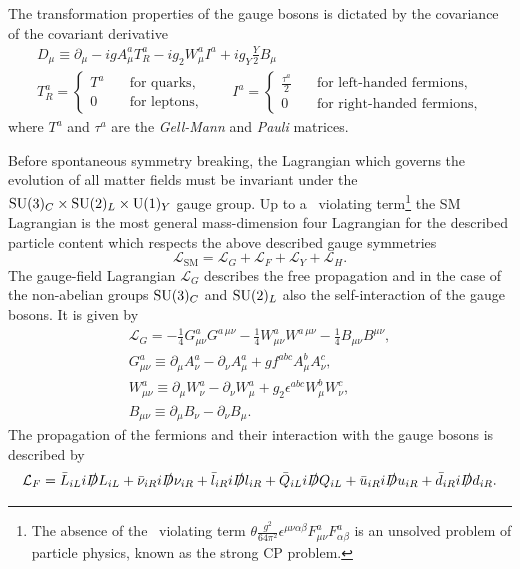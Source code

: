 The transformation properties of the gauge bosons is dictated by the covariance of the covariant derivative
\begin{equation}
\begin{gathered}
D_\mu \equiv \partial_\mu - i g A^a_\mu T_R^a - i g_2 W_\mu^a I^a + i g_Y \frac{Y}{2} B_\mu \\
T_R^a = \begin{cases} T^a \quad &\text{for quarks}, \\
  0 \quad &\text{for leptons},
\end{cases}
\qquad I^a = \begin{cases} \frac{\tau^a}{2} \quad &\text{for left-handed fermions}, \\
  0 \quad &\text{for right-handed fermions},
\end{cases}
\end{gathered}
\label{eq:2:covariant_derivative}
\end{equation}
where $T^a$ and $\tau^a$ are the \textit{Gell-Mann} and \textit{Pauli} matrices.

Before spontaneous symmetry breaking, the Lagrangian which governs the evolution of all matter fields must be invariant under the $\mathrm{SU}(3)_C \times \mathrm{SU}(2)_L \times \mathrm{U}(1)_Y$ gauge group. Up to a \Charge\Parity\ violating term\footnote{The absence of the \Charge\Parity\ violating term $\theta \frac{g^2}{64 \pi^2}\epsilon^{\mu \nu \alpha \beta} F^{a}_{\mu \nu} F^{a}_{\alpha \beta}$ is an unsolved problem of particle physics, known as the strong CP problem.} the SM Lagrangian is the most general mass-dimension four Lagrangian for the described particle content which respects the above described gauge symmetries
\begin{equation}
\mathcal{L}_\mathrm{SM} = \mathcal{L}_G + \mathcal{L}_F + \mathcal{L}_Y + \mathcal{L}_H.
\end{equation}
The gauge-field Lagrangian $\mathcal{L}_G$ describes the free propagation and in the case of the non-abelian groups $\mathrm{SU}(3)_C$ and $\mathrm{SU}(2)_L$ also the self-interaction of the gauge bosons. It is given by
\begin{equation}
\begin{gathered}
\mathcal{L}_G = - \frac{1}{4} G^{a}_{\mu \nu} G^{a\, \mu\nu} - \frac{1}{4} W^a_{\mu \nu} W^{a\, \mu\nu} - \frac{1}{4} B_{\mu\nu} B^{\mu \nu}, \\
G^a_{\mu\nu} \equiv \partial_\mu A^a_\nu - \partial_\nu A^a_\mu + g f^{abc} A^b_\mu A^c_\nu, \\
W^a_{\mu\nu} \equiv \partial_\mu W^a_\nu - \partial_\nu W^a_\mu + g_2 \epsilon^{abc} W^b_\mu W^c_\nu, \\
B_{\mu\nu} \equiv \partial_\mu B_\nu - \partial_\nu B_\mu.
\end{gathered}
\end{equation}
The propagation of the fermions and their interaction with the gauge bosons is described by
\begin{equation}
\mathcal{L}_F = \bar{L}_{iL} i \slashed{D} L_{iL} + \bar{\nu}_{iR} i \slashed{D} \nu_{iR} + \bar{l}_{iR} i \slashed{D} l_{iR} + \bar{Q}_{iL} i \slashed{D} Q_{iL} + \bar{u}_{iR} i \slashed{D} u_{iR} + \bar{d}_{iR} i \slashed{D} d_{iR}.
\end{equation}


